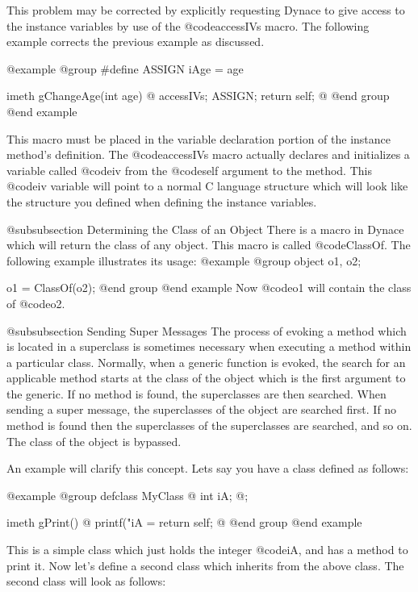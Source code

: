 This problem may be corrected by explicitly requesting Dynace to give
access to the instance variables by use of the @code{accessIVs} macro.
The following example corrects the previous example as discussed.

@example
@group
#define ASSIGN  iAge = age

imeth   gChangeAge(int age)
@{
        accessIVs;
        ASSIGN;
        return self;
@}
@end group
@end example

This macro must be placed in the variable declaration portion of the
instance method's definition.  The @code{accessIVs} macro actually declares
and initializes a variable called @code{iv} from the @code{self} argument
to the method.  This @code{iv} variable will point to a normal C language
structure which will look like the structure you defined when defining
the instance variables.



@subsubsection Determining the Class of an Object
There is a macro in Dynace which will return the class of any object.  This
macro is called @code{ClassOf}.  The following example illustrates its usage:
@example
@group
        object  o1, o2;

        o1 = ClassOf(o2);
@end group
@end example
Now @code{o1} will contain the class of @code{o2}.

@subsubsection Sending Super Messages
The process of evoking a method which is located in a superclass is
sometimes necessary when executing a method within a particular class.
Normally, when a generic function is evoked, the search for an applicable
method starts at the class of the object which is the first argument to
the generic.  If no method is found, the superclasses are then
searched.  When sending a super message, the superclasses of the object
are searched first.  If no method is found then the superclasses of the
superclasses are searched, and so on.  The class of the object is bypassed.

An example will clarify this concept.  Lets say you have a class defined
as follows:

@example
@group
defclass  MyClass  @{
        int     iA;
@};

imeth   gPrint()
@{
        printf("iA = %
        return self;
@}
@end group
@end example

This is a simple class which just holds the integer @code{iA}, and has
a method to print it.  Now let's define a second class which inherits
from the above class.  The second class will look as follows:

